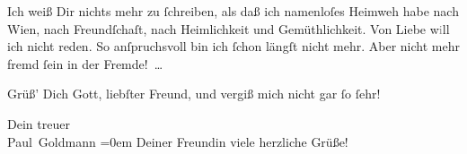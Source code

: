 \pstart
           Ich weiß Dir nichts mehr zu ſchreiben, als daß ich namenloſes Heimweh habe nach Wien, nach Freundſchaſt, nach Heimlichkeit und
               Gemüthlichkeit. Von Liebe w\textcolor{gray}{i}ll ich nicht reden. So anſpruchsvoll
               bin ich ſchon längſt nicht mehr. Aber nicht mehr fremd ſein in der Fremde! {\dots}\pend
           
\pstart
           Grüß’ Dich Gott, liebſter Freund, und vergiß mich nicht gar ſo ſehr!\pend
           
\pstart
           Dein treuer {\\[\baselineskip]}\spacefill\mbox{Paul Goldmann}\pend
           \leftskip=0em{}
\pstart
           \noindent{}Deiner Freundin viele
                  herzliche Grüße!\pend
           \endnumbering{}  
      